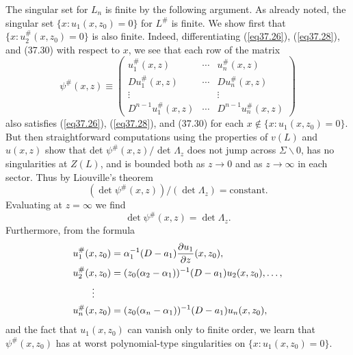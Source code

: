 \documentclass{surv-l}
\theoremstyle{plain}
\theoremstyle{definition}
\numberwithin{equation}{chapter}
\begin{document}
The singular set for $L_{n}$ is finite by the following argument. As already noted, the singular set $\{x:u_{1}(x, z_{0})=0\}$ for $L^{\#}$ is finite. We show first that $\{x : u_{2}^{\#}(x, z_{0})=0\}$ is also finite. Indeed, differentiating (\ref{eq37.26}), (\ref{eq37.28}), and (37.30) with respect to $x$, we see that each row of the matrix
\begin{equation}\label{eq37.43}
\psi^{\#}(x,z)\equiv\left(\begin{array}{ccc}
u_{1}^{\#}(x, z) & \cdots &  u_{n}^{\#}(x, z)\\
Du_{1}^{\#}(x, z) & \cdots &  Du_{n}^{\#}(x,z)\\
\vdots &  & \vdots \\
D^{n-1}u_{1}^{\#}(x, z) & \cdots & D^{n-1}u_{n}^{\#}(x,z)
\end{array}\right)
\end{equation}
also satisfies (\ref{eq37.26}), (\ref{eq37.28}), and (37.30) for each $x\not\in\{x:u_{1}(x,z_{0})=0\}$. But then straightforward computations using the properties of $v(L)$ and $u(x, z)$ show that det $\psi^{\#}(x, z)/$ det $\Lambda_{z}$ does not jump across $\Sigma\backslash 0$, has no singularities at $Z(L)$, and is bounded both as $z\rightarrow 0$ and as $ z\rightarrow\infty$ in each sector. Thus by Liouville's theorem
\begin{equation*}
(\det\psi^{\#}(x, z))/(\det\Lambda_{z})= \mathrm{constant}.
\end{equation*}
Evaluating at $ z=\infty$ we find
\begin{equation}\label{eq37.44}
\det\psi^{\#}(x, z)=\det\Lambda_{z}.
\end{equation}
Furthermore, from the formula
\begin{align}\label{eq37.45}
& u_{1}^{\#}(x,z_{0})=\alpha_{1}^{-1}(D-a_{1})\frac{\partial u_{1}}{\partial z}(x, z_{0}),\\
& u_{2}^{\#}(x, z_{0})=(z_{0}(\alpha_{2}-\alpha_{1}))^{-1}(D-a_{1})u_{2}(x, z_{0}),\ldots,\notag \\
&   \qquad \vdots \notag \\
& u_{n}^{\#}(x, z_{0})=(z_{0}(\alpha_{n}-\alpha_{1}))^{-1}(D-a_{1})u_{n}(x, z_{0}), \notag
\end{align}
and the fact that $u_{1}(x,z_{0})$ can vanish only to finite order, we learn that $\psi^{\#}(x, z_{0})$ has at worst polynomial-type singularities on $\{x:u_{1} (x, z_{0})=0\}$.
\end{document}
